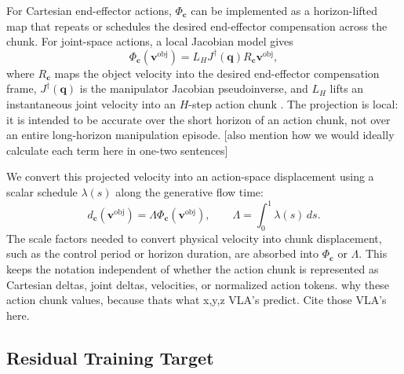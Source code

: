 \documentclass[10pt,twocolumn,letterpaper]{article}
\newcommand{\EditAP}[1]{{\color{blue} #1}}
\begin{document}
For Cartesian end-effector actions, $\Phi_{\mathbf c}$ can be implemented as a
horizon-lifted map that repeats or schedules the desired end-effector
compensation across the chunk. For joint-space actions, a local Jacobian model
gives
\begin{equation}
    \Phi_{\mathbf c}(\mathbf v^{\mathrm{obj}})
    =
    L_H J^\dagger(\mathbf q) R_{\mathbf c}\mathbf v^{\mathrm{obj}},
    \label{eq:kinematic_projection}
\end{equation}
where $R_{\mathbf c}$ maps the object velocity into the desired end-effector
compensation frame, $J^\dagger(\mathbf q)$ is the manipulator Jacobian
pseudoinverse, and $L_H$ lifts an instantaneous joint velocity into an
$H$-step action chunk \citep{nakamura1991advanced,siciliano2009robotics}. The
projection is local: it is intended to be accurate over the short horizon of an
action chunk, not over an entire long-horizon manipulation episode. \EditAP{[also mention how we would ideally calculate each term here in one-two sentences]}

We convert this projected velocity into an action-space displacement using a
scalar schedule $\lambda(s)$ along the generative flow time:
\begin{equation}
    d_{\mathbf c}(\mathbf v^{\mathrm{obj}})
    =
    \Lambda \Phi_{\mathbf c}(\mathbf v^{\mathrm{obj}}),
    \qquad
    \Lambda=\int_0^1 \lambda(s)\,ds .
    \label{eq:integrated_velocity_displacement}
\end{equation}
The scale factors needed to convert physical velocity into chunk displacement,
such as the control period or horizon duration, are absorbed into
$\Phi_{\mathbf c}$ or $\Lambda$. This keeps the notation independent of whether
the action chunk is represented as Cartesian deltas, joint deltas, velocities,
or normalized action tokens. \EditAP{why these action chunk values, because thats what x,y,z VLA's predict. Cite those VLA's here.}

\subsection{Residual Training Target}
\label{subsec:residual_target}
\end{document}
